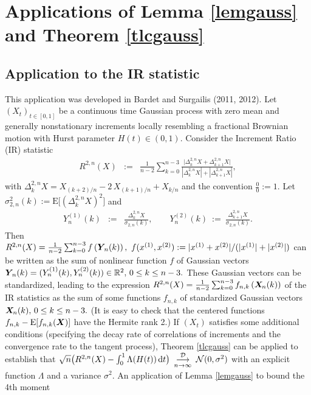 \documentclass[10pt]{article}
\def\R{\mathbb{R}}
\def\d{\mathrm d}
\def\E{\mathrm E}
\newcommand{\mbf}[1]{\mbox{\boldmath $#1$}}
\def\limiteloin{\renewcommand{\arraystretch}{0.5}
\begin{array}[t]{c}
\stackrel{{\cal D}}{\longrightarrow} \\
{\scriptstyle n \rightarrow\infty}
\end{array}\renewcommand{\arraystretch}{1}}
\begin{document}
\section{Applications of Lemma \ref{lemgauss} and Theorem \ref{tlcgauss}}\label{Applications}
\subsection{Application to the IR statistic}

This application was developed in Bardet and Surgailis (2011, 2012).
Let $(X_t)_{t\in [0,1]}$ be a  continuous time Gaussian process with zero mean and generally nonstationary increments  locally
resembling a fractional Brownian motion with Hurst parameter $H(t) \in (0,1)$.
Consider the Increment Ratio (IR) statistic
\begin{eqnarray*}
R^{2,n} (X) &:=&\frac{1}{n-2} \sum_{k=0}^{n-3}
\frac{\big|\Delta^{2,n}_k X +  \Delta^{2,n}_{k+1} X \big|}
{|\Delta^{2,n}_k X| + |\Delta^{2,n}_{k+1} X| }, \label{R_p}
\end{eqnarray*}
with $\Delta^{2,n}_k X =X_{(k+2)/n}-2\, X_{(k+1)/n}+X_{k/n}$ and the convention $\frac{0}{0}:=1$. Let
$\sigma^2_{2,n}(k):=\E \Big[ \left(\Delta^{2,n}_k X\right)^2\Big] $ and
\begin{eqnarray*}
Y^{(1)}_{n}(k)&:=&\frac{\Delta^{2,n}_{k} X}{\sigma_{2,n}(k)}, \qquad Y^{(2)}_{n}(k) \ :=\ \frac{\Delta^{2,n}_{k+1} X}{\sigma_{2,n}(k)}.
\end{eqnarray*}
Then $R^{2,n} (X) = \frac 1 {n-2} \sum_{k=0}^{n-3} f\left({\mbf Y}_{\! n}(k)\right), \ f(x^{(1)}, x^{(2)}) :=
|x^{(1)}+x^{(2)}|/(|x^{(1)}|+|x^{(2)}|) $ can be written as the sum of nonlinear function $f $
of Gaussian vectors
${\mbf Y}_{\! n}(k) = (Y^{(1)}_n(k), Y^{(2)}_n(k)) \in
{\R}^2, \, 0 \le k \le n-3. $ These Gaussian  vectors can be standardized, leading to the expression
$R^{2,n} (X) = \frac 1 {n-2} \sum_{k=0}^{n-3} f_{n,k}\left({\mbf X}_{\! n}(k)\right) $ of the IR statistics  as the sum of some functions
$f_{n,k}$ of standardized Gaussian vectors  ${\mbf X}_{\! n}(k),  \, 0 \le k \le n-3. $ (It is easy to check that
the centered functions
$f_{n,k} - \E [f_{n,k}({\mbf X})]$ have the Hermite rank 2.)
If $(X_t)$ satisfies some additional conditions (specifying the decay rate of correlations of increments and the convergence
rate to the tangent process), Theorem \ref{tlcgauss} can be applied to establish 
that $\sqrt n \big (R^{2,n} (X) - \int_0^1 \Lambda(H(t))\, \d t\big)\limiteloin {\cal N} (0,\sigma^2) $ with an explicit function $\Lambda$ and a variance $\sigma^2.$ An application of Lemma \ref{lemgauss} to bound the 4th moment
\end{document}

